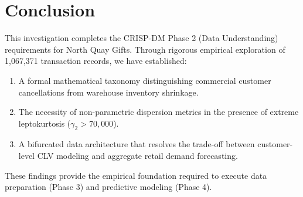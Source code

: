 \documentclass[journal,10pt,twocolumn]{IEEEtran}
\begin{document}
\section{Conclusion}
This investigation completes the CRISP-DM Phase 2 (Data Understanding) requirements for North Quay Gifts. Through rigorous empirical exploration of 1,067,371 transaction records, we have established:
\begin{enumerate}
    \item A formal mathematical taxonomy distinguishing commercial customer cancellations from warehouse inventory shrinkage.
    \item The necessity of non-parametric dispersion metrics in the presence of extreme leptokurtosis ($\gamma_2 > 70,000$).
    \item A bifurcated data architecture that resolves the trade-off between customer-level CLV modeling and aggregate retail demand forecasting.
\end{enumerate}
These findings provide the empirical foundation required to execute data preparation (Phase 3) and predictive modeling (Phase 4).



\end{document}
